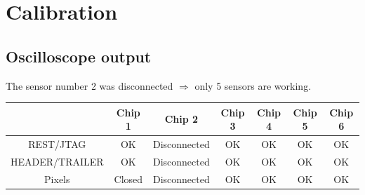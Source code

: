 \documentclass[a4papper, 10pt]{article}
\begin{document}
  \section{Calibration}
  
  \subsection{Oscilloscope output}
  
  The sensor number 2 was disconnected $\Rightarrow$ only 5 sensors are working.
  
  \begin{center}
    \begin{tabular}{c c c c c c c}
      \hline %
        & Chip 1 & Chip 2 & Chip 3 & Chip 4 & Chip 5 & Chip 6 \tabularnewline 
      \hline %
      \hline %
      REST/JTAG & OK & \cellcolor{red}Disconnected & OK & OK & OK & OK  \tabularnewline
      HEADER/TRAILER & OK & \cellcolor{red}Disconnected & OK & OK & OK & OK \tabularnewline
      Pixels & Closed & \cellcolor{red}Disconnected & OK & OK & OK & OK \tabularnewline
      \hline %
    \end{tabular}
  \end{center}
  
\end{document}
